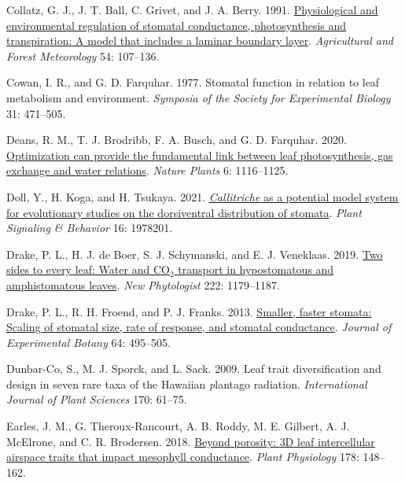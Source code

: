 \documentclass[
  letterpaper,
  DIV=11,
  numbers=noendperiod]{scrartcl}
\newlength{\cslhangindent}
\newlength{\cslentryspacingunit} %
\newenvironment{CSLReferences}[2] %
 {%
  \setlength{\parindent}{0pt}
  \ifodd #1
  \let\oldpar\par
  \def\par{\hangindent=\cslhangindent\oldpar}
  \fi
  \setlength{\parskip}{#2\cslentryspacingunit}
 }%
 {}
\begin{document}
\begin{CSLReferences}{1}{0}
\leavevmode{}%
Collatz, G. J., J. T. Ball, C. Grivet, and J. A. Berry. 1991.
\href{https://doi.org/10.1016/0168-1923(91)90002-8}{Physiological and
environmental regulation of stomatal conductance, photosynthesis and
transpiration: A model that includes a laminar boundary layer}.
\emph{Agricultural and Forest Meteorology} 54: 107--136.

\leavevmode{}%
Cowan, I. R., and G. D. Farquhar. 1977. Stomatal function in relation to
leaf metabolism and environment. \emph{Symposia of the Society for
Experimental Biology} 31: 471--505.

\leavevmode{}%
Deans, R. M., T. J. Brodribb, F. A. Busch, and G. D. Farquhar. 2020.
\href{https://doi.org/10.1038/s41477-020-00760-6}{Optimization can
provide the fundamental link between leaf photosynthesis, gas exchange
and water relations}. \emph{Nature Plants} 6: 1116--1125.

\leavevmode{}%
Doll, Y., H. Koga, and H. Tsukaya. 2021.
\href{https://doi.org/10.1080/15592324.2021.1978201}{\emph{Callitriche}
as a potential model system for evolutionary studies on the dorsiventral
distribution of stomata}. \emph{Plant Signaling \& Behavior} 16:
1978201.

\leavevmode{}%
Drake, P. L., H. J. de Boer, S. J. Schymanski, and E. J. Veneklaas.
2019. \href{https://doi.org/10.1111/nph.15652}{Two sides to every leaf:
Water and {CO}\(_{\textrm{2}}\) transport in hypostomatous and
amphistomatous leaves}. \emph{New Phytologist} 222: 1179--1187.

\leavevmode{}%
Drake, P. L., R. H. Froend, and P. J. Franks. 2013.
\href{https://doi.org/10.1093/jxb/ers347}{Smaller, faster stomata:
Scaling of stomatal size, rate of response, and stomatal conductance}.
\emph{Journal of Experimental Botany} 64: 495--505.

\leavevmode{}%
Dunbar-Co, S., M. J. Sporck, and L. Sack. 2009. Leaf trait
diversification and design in seven rare taxa of the {Hawaiian}
\emph{p}lantago radiation. \emph{International Journal of Plant
Sciences} 170: 61--75.

\leavevmode{}%
Earles, J. M., G. Theroux-Rancourt, A. B. Roddy, M. E. Gilbert, A. J.
McElrone, and C. R. Brodersen. 2018.
\href{https://doi.org/10.1104/pp.18.00550}{Beyond porosity: {3D} leaf
intercellular airspace traits that impact mesophyll conductance}.
\emph{Plant Physiology} 178: 148--162.


\end{CSLReferences}
\end{document}
